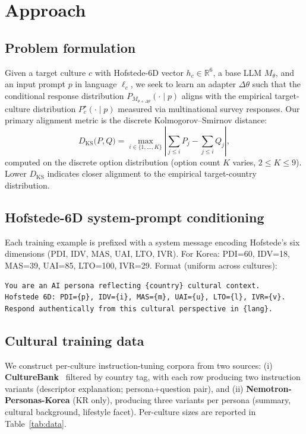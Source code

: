 \documentclass{article}
\begin{document}
\section{Approach}
\label{sec:approach}

\subsection{Problem formulation}
Given a target culture $c$ with Hofstede-6D vector $h_c \in \mathbb{R}^6$, a base LLM $M_\theta$, and an input prompt $p$ in language $\ell_c$, we seek to learn an adapter $\Delta\theta$ such that the conditional response distribution $P_{M_{\theta+\Delta\theta}}(\cdot \mid p)$ aligns with the empirical target-culture distribution $P_c^\star(\cdot \mid p)$ measured via multinational survey responses. Our primary alignment metric is the discrete Kolmogorov--Smirnov distance:
\begin{equation}
\label{eq:ks}
D_\mathrm{KS}\big(P, Q\big) = \max_{i \in \{1,\ldots,K\}} \left| \sum_{j\le i} P_j - \sum_{j\le i} Q_j \right|,
\end{equation}
computed on the discrete option distribution (option count $K$ varies, $2 \le K \le 9$). Lower $D_\mathrm{KS}$ indicates closer alignment to the empirical target-country distribution.

\subsection{Hofstede-6D system-prompt conditioning}
Each training example is prefixed with a system message encoding Hofstede's six dimensions (PDI, IDV, MAS, UAI, LTO, IVR). For Korea: PDI=60, IDV=18, MAS=39, UAI=85, LTO=100, IVR=29. Format (uniform across cultures):
\begin{verbatim}
You are an AI persona reflecting {country} cultural context.
Hofstede 6D: PDI={p}, IDV={i}, MAS={m}, UAI={u}, LTO={l}, IVR={v}.
Respond authentically from this cultural perspective in {lang}.
\end{verbatim}

\subsection{Cultural training data}
We construct per-culture instruction-tuning corpora from two sources: (i) \textbf{CultureBank}~\cite{shi2024culturebank} filtered by country tag, with each row producing two instruction variants (descriptor explanation; persona+question pair), and (ii) \textbf{Nemotron-Personas-Korea} (KR only), producing three variants per persona (summary, cultural background, lifestyle facet). Per-culture sizes are reported in Table~\ref{tab:data}.
\end{document}
